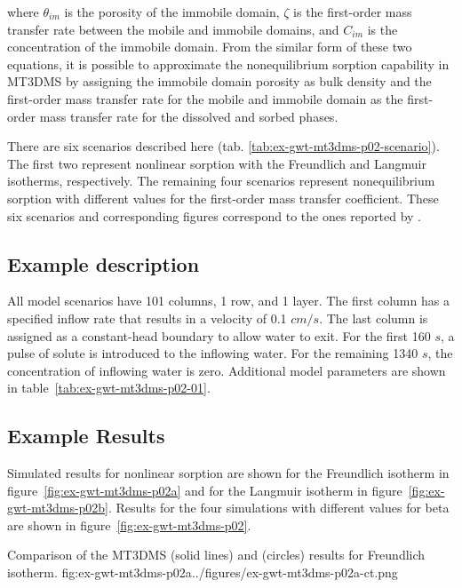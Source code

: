 \noindent where $\theta_{im}$ is the porosity of the immobile domain, $\zeta$ is the first-order mass transfer rate between the mobile and immobile domains, and $C_{im}$ is the concentration of the immobile domain.  From the similar form of these two equations, it is possible to approximate the nonequilibrium sorption capability in MT3DMS by assigning the immobile domain porosity as bulk density and the first-order mass transfer rate for the mobile and immobile domain as the first-order mass transfer rate for the dissolved and sorbed phases.

There are six scenarios described here (tab. \ref{tab:ex-gwt-mt3dms-p02-scenario}).  The first two represent nonlinear sorption with the Freundlich and Langmuir isotherms, respectively.  The remaining four scenarios represent nonequilibrium sorption with different values for the first-order mass transfer coefficient.  These six scenarios and corresponding figures correspond to the ones reported by \cite{zheng1999mt3dms}.



\subsection{Example description}

All model scenarios have 101 columns, 1 row, and 1 layer. The first column has a specified inflow rate that results in a velocity of 0.1 $cm/s$. The last column is assigned as a constant-head boundary to allow water to exit.  For the first 160 $s$, a pulse of solute is introduced to the inflowing water.  For the remaining 1340 $s$, the concentration of inflowing water is zero.  Additional model parameters are shown in table~\ref{tab:ex-gwt-mt3dms-p02-01}.



\subsection{Example Results}
Simulated results for nonlinear sorption are shown for the Freundlich isotherm in figure~\ref{fig:ex-gwt-mt3dms-p02a} and for the Langmuir isotherm in figure~\ref{fig:ex-gwt-mt3dms-p02b}.  Results for the four simulations with different values for beta are shown in figure~\ref{fig:ex-gwt-mt3dms-p02}.

\begin{StandardFigure}
	{Comparison of the MT3DMS (solid lines) and \mf (circles) results for Freundlich isotherm.}
	{fig:ex-gwt-mt3dms-p02a}{../figures/ex-gwt-mt3dms-p02a-ct.png}
\end{StandardFigure}

